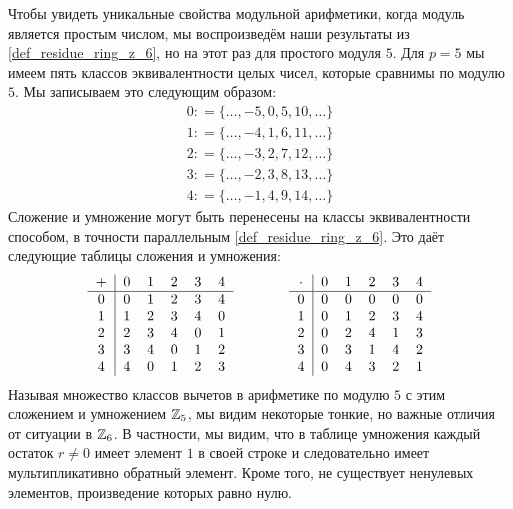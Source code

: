 \begin{example} 
\label{primfield_z_5}
Чтобы увидеть уникальные свойства модульной арифметики, когда модуль является простым числом, мы воспроизведём наши результаты из \examplename{} \ref{def_residue_ring_z_6}, но на этот раз для простого модуля $5$.
Для $ p = 5 $ мы имеем пять классов эквивалентности целых чисел, которые сравнимы по модулю $ 5 $. Мы записываем это следующим образом:
$$
\begin{array}{ccc}
0: = \{\ldots, -5,0,5,10, \ldots \}\\
1: = \{\ldots, -4,1,6,11, \ldots \}\\
2: = \{\ldots, -3,2,7,12, \ldots \} \\
3: = \{\ldots, -2,3,8,13, \ldots \}\\
4: = \{\ldots, -1,4,9,14, \ldots \}
\end{array}
$$
Сложение и умножение могут быть перенесены на классы эквивалентности способом, в точности параллельным \examplename{} \ref{def_residue_ring_z_6}. Это даёт следующие таблицы сложения и умножения:
\begin{equation}\label{Z5_tables}
  \begin{tabular}{c | c c c c c}
    + & 0 & 1 & 2 & 3 & 4 \\\hline
    0 & 0 & 1 & 2 & 3 & 4 \\
    1 & 1 & 2 & 3 & 4 & 0 \\
    2 & 2 & 3 & 4 & 0 & 1 \\
    3 & 3 & 4 & 0 & 1 & 2 \\
    4 & 4 & 0 & 1 & 2 & 3 \\
  \end{tabular} \quad \quad \quad \quad
  \begin{tabular}{c | c c c c c}
$ \cdot $ & 0 & 1 & 2 & 3 & 4 \\\hline
      0 & 0 & 0 & 0 & 0 & 0 \\
      1 & 0 & 1 & 2 & 3 & 4 \\
      2 & 0 & 2 & 4 & 1 & 3 \\
      3 & 0 & 3 & 1 & 4 & 2 \\
      4 & 0 & 4 & 3 & 2 & 1 \\
  \end{tabular}
\end{equation}
Называя множество классов вычетов в арифметике по модулю $5$ с этим сложением и умножением $\mathbb{Z}_5$, мы видим некоторые тонкие, но важные отличия от ситуации в $\mathbb{Z}_6$. В частности, мы видим, что в таблице умножения каждый остаток $r\neq 0$ имеет элемент $1$ в своей строке и следовательно имеет мультипликативно обратный элемент. Кроме того, не существует ненулевых элементов, произведение которых равно нулю.


\end{example}
